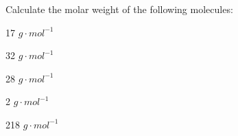 \documentclass[main.tex]{subfiles}
\begin{document}
\begin{multicols*}{2}
\begin{question}[ID=\the\value{numA}]
Calculate the molar weight of the following molecules:
\begin{inparaenum}[(a)]	
\item  {}	%
\item 	{}	%
\item 	{}	%
\item 	{}	%
\item 	{}	%
\end{inparaenum} 
\end{question}
\begin{solution}
\begin{inparaenum}[(a)]	
 \item   	17 $g\cdot mol^{-1}$
\item 	 32 $g\cdot mol^{-1}$
\item 	 28 $g\cdot mol^{-1}$
\item 	 2 $g\cdot mol^{-1}$
\item 	 218 $g\cdot mol^{-1}$
\end{inparaenum} 
\hspace{0.1cm}\end{solution}%



\end{multicols*}
\end{document}
